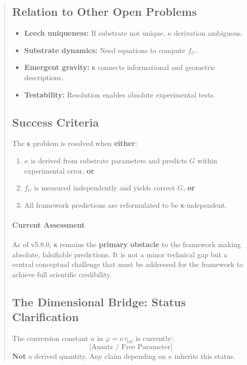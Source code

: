 \documentclass[11pt,titlepage]{article}
\begin{document}
\begin{abstract}
\subsection{Relation to Other Open Problems}

\begin{itemize}
\item \textbf{Leech uniqueness:} If substrate not unique, $\kappa$ derivation ambiguous.
\item \textbf{Substrate dynamics:} Need equations to compute $f_U$.
\item \textbf{Emergent gravity:} κ connects informational and geometric descriptions.
\item \textbf{Testability:} Resolution enables absolute experimental tests.
\end{itemize}

\subsection{Success Criteria}

The κ problem is resolved when \textbf{either}:
\begin{enumerate}
\item $\kappa$ is derived from substrate parameters and predicts $G$ within experimental error, \textbf{or}
\item $f_U$ is measured independently and yields correct $G$, \textbf{or}  
\item All framework predictions are reformulated to be κ-independent.
\end{enumerate}

\paragraph{Current Assessment}
As of v5.8.0, κ remains the \textbf{primary obstacle} to the framework making absolute, falsifiable predictions. It is not a minor technical gap but a central conceptual challenge that must be addressed for the framework to achieve full scientific credibility.


\subsection{The Dimensional Bridge: Status Clarification}
\label{sec:units-bridge-status}

\begin{tcolorbox}[colback=red!5!white,colframe=red!75!black,title=Critical Status Update]
The conversion constant $\kappa$ in $\varphi = \kappa \tau_{\mathrm{lat}}$ is currently:
\[
\boxed{\text{[Ansatz / Free Parameter]}}
\]
\textbf{Not} a derived quantity. Any claim depending on $\kappa$ inherits this status.
\end{tcolorbox}


\end{abstract}
\end{document}
